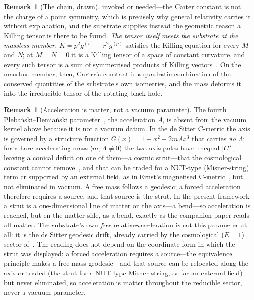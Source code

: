 \documentclass[11pt,a4paper]{article}
\theoremstyle{definition}
\newtheorem{remark}[theorem]{Remark}
\begin{document}
\begin{remark}[The chain, drawn]
invoked or needed---the Carter constant is not the charge of a point symmetry, which is precisely why general
relativity carries it without explanation, and the substrate supplies instead the geometric reason a Killing
tensor is there to be found.
\emph{The tensor itself meets the substrate at the massless member.} $K=p^{2}g^{(r)}-r^{2}g^{(p)}$ satisfies
the Killing equation for every $M$ and $N$; at
$M=N=0$ it is a Killing tensor of a space of constant curvature, and every such tensor is a sum of
symmetrised products of Killing vectors~\cite{Thompson1986}. On the massless member, then, Carter's constant
is a quadratic combination of the conserved quantities of the substrate's own isometries, and the mass deforms
it into the irreducible tensor of the rotating black hole.
\end{remark}

\begin{remark}[Acceleration is matter, not a vacuum parameter]\label{rem:accel}
The fourth Plebański--Demiański parameter~\cite{PlebanskiDemianski}, the acceleration $A$, is absent from the vacuum kernel above because it is not a vacuum datum. In the de Sitter C-metric the axis is governed by a structure function $G(x)=1-x^{2}-2mAx^{3}$ that carries \emph{no} $\Lambda$; for a bare accelerating mass ($m,A\neq0$) the two axis poles have unequal $|G'|$, leaving a conical deficit on one of them---a cosmic strut---that the cosmological constant cannot remove~\cite{PodolskyGriffiths2001}, and that can be traded for a NUT-type (Misner-string) term or supported by an external field, as in Ernst's magnetised C-metric~\cite{Ernst1976}, but not eliminated in vacuum. A free mass follows a geodesic; a forced acceleration therefore requires a source, and that source is the strut. In the present framework a strut is a one-dimensional line of matter on the axis---a bend---so acceleration is reached, but on the matter side, as a bend, exactly as the companion paper reads all matter. The substrate's own \emph{free} relative-acceleration is not this parameter at all: it is the de Sitter geodesic drift, already carried by the cosmological ($E=1$) sector of~\cite{JanzenOperator}. The reading does not depend on the coordinate form in which the strut was displayed: a forced acceleration requires a source---the equivalence principle makes a free mass geodesic---and that source can be relocated along the axis or traded (the strut for a NUT-type Misner string, or for an external field) but never eliminated, so acceleration is matter throughout the reducible sector, never a vacuum parameter.
\end{remark}
\end{document}
